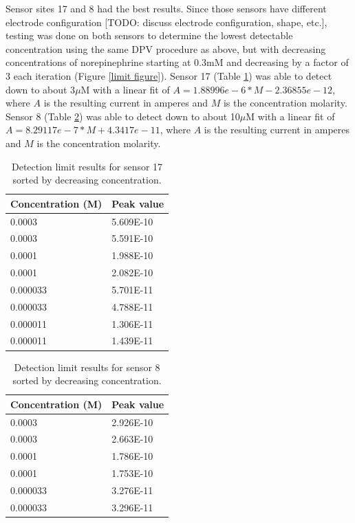 Sensor sites 17 and 8 had the best results. Since those sensors have different electrode configuration [TODO: discuss electrode configuration, shape, etc.], testing was done on both sensors to determine the lowest detectable concentration using the same DPV procedure as above, but with decreasing concentrations of norepinephrine starting at 0.3mM and decreasing by a factor of 3 each iteration (Figure \ref{limit figure}). Sensor 17 (Table \ref{limit 17}) was able to detect down to about 3$\mu$M with a linear fit of $A = 1.88996e-6 * M - 2.36855e-12$, where $A$ is the resulting current in amperes and $M$ is the concentration molarity. Sensor 8 (Table \ref{limit 8}) was able to detect down to about 10$\mu$M with a linear fit of $A = 8.29117e-7 * M + 4.3417e-11$, where $A$ is the resulting current in amperes and $M$ is the concentration molarity.

\begin{table}
	\begin{tabular}{ll}
		Concentration (M) & Peak value \\
		\hline
		0.0003 & 5.609E-10 \\
		0.0003 & 5.591E-10 \\
		0.0001 & 1.988E-10 \\
		0.0001 & 2.082E-10 \\
		0.000033 & 5.701E-11 \\
		0.000033 & 4.788E-11 \\
		0.000011 & 1.306E-11 \\
		0.000011 & 1.439E-11 \\
	\end{tabular}
	\caption[Detection limit results for sensor 17.]{Detection limit results for sensor 17 sorted by decreasing concentration.}
	\label{limit 17}
\end{table}

\begin{table}
	\begin{tabular}{ll}
		Concentration (M) & Peak value \\
		\hline
		0.0003 & 2.926E-10 \\
		0.0003 & 2.663E-10 \\
		0.0001 & 1.786E-10 \\
		0.0001 & 1.753E-10 \\
		0.000033 & 3.276E-11 \\
		0.000033 & 3.296E-11 \\
	\end{tabular}
	\caption[Detection limit results for sensor 8.]{Detection limit results for sensor 8 sorted by decreasing concentration.}
	\label{limit 8}
\end{table}

